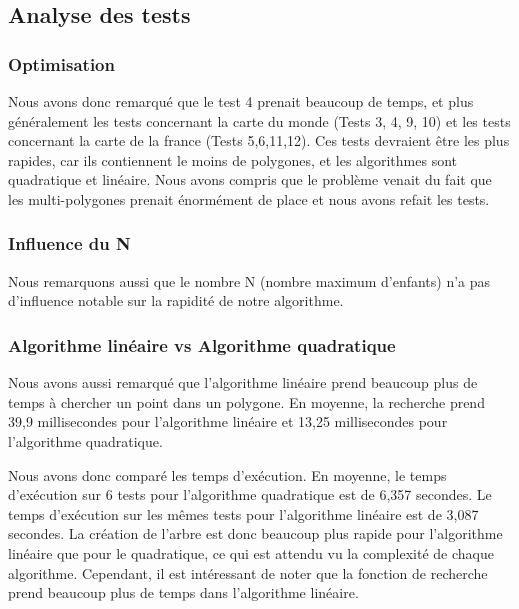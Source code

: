 \documentclass[utf8]{article}
\begin{document}
\begin{large}
    \subsection{Analyse des tests}\label{Analyse des tests}
    \subsubsection{Optimisation}
    \par
    \indent
    Nous avons donc remarqué que le test 4 prenait beaucoup de temps,
    et plus généralement les tests concernant la carte du monde (Tests 3, 4, 9, 10)
    et les tests concernant la carte de la france (Tests 5,6,11,12). Ces tests
    devraient être les plus rapides, car ils contiennent le moins de polygones, et
    les algorithmes sont quadratique et linéaire. Nous avons compris que le
    problème venait du fait que les multi-polygones prenait énormément de place et nous avons refait les tests.
    \par
    \subsubsection{Influence du N}
    \par
    \indent
    Nous remarquons aussi que le nombre N (nombre maximum d'enfants) n'a pas
    d'influence notable sur la rapidité de notre algorithme.
    \par
    \subsubsection{Algorithme linéaire vs Algorithme quadratique}
    \par
    \indent
    Nous avons aussi remarqué que l'algorithme linéaire prend beaucoup plus de temps
    à chercher un point dans un polygone. En moyenne, la recherche prend 39,9
    millisecondes pour l'algorithme linéaire et 13,25 millisecondes pour
    l'algorithme quadratique.
    \par
    \indent
    \par
    Nous avons donc comparé les temps d'exécution. En moyenne, le temps
    d'exécution sur 6 tests pour l'algorithme quadratique est de 6,357 secondes.
    Le temps d'exécution sur les mêmes tests pour l'algorithme linéaire est de
    3,087 secondes. La création de l'arbre est donc beaucoup plus rapide pour
    l'algorithme linéaire que pour le quadratique, ce qui est attendu vu la
    complexité de chaque algorithme. Cependant, il est intéressant de noter que la
    fonction de recherche prend beaucoup plus de temps dans l'algorithme linéaire.
    \par


\end{large}
\end{document}
